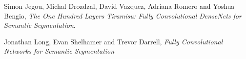 \documentclass[a4,12pt]{article}
\begin{document}
	\begin{thebibliography}{9}
		
		Simon Jegou, Michal Drozdzal, David Vazquez, Adriana Romero and Yoshua Bengio,
		\textit{The One Hundred Layers Tiramisu: Fully Convolutional DenseNets for Semantic Segmentation}.
		
		Jonathan Long, Evan Shelhamer and Trevor Darrell,
		\textit{Fully Convolutional Networks for Semantic Segmentation}
		
	\end{thebibliography}
\end{document}
